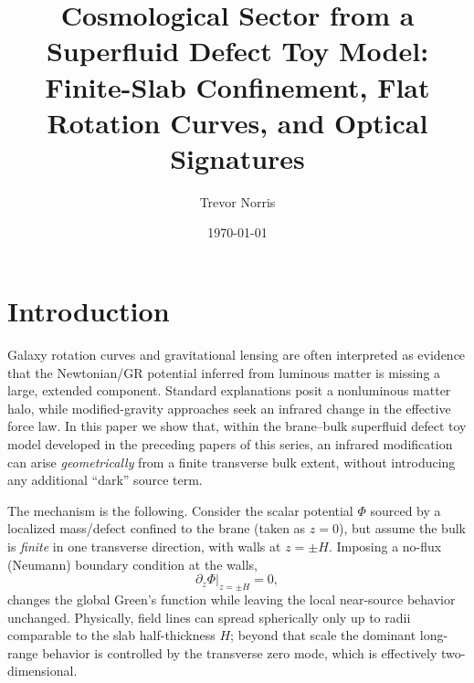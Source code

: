\documentclass[11pt]{article}
\title{Cosmological Sector from a Superfluid Defect Toy Model:\\
Finite-Slab Confinement, Flat Rotation Curves, and Optical Signatures}
\author{Trevor Norris}
\date{\today}
\begin{document}
\maketitle

\begin{abstract}
\end{abstract}

\section{Introduction}
\label{sec:introduction}

Galaxy rotation curves and gravitational lensing are often interpreted as evidence that the
Newtonian/GR potential inferred from luminous matter is missing a large, extended component.
Standard explanations posit a nonluminous matter halo, while modified-gravity approaches seek an
infrared change in the effective force law.
In this paper we show that, within the brane--bulk superfluid defect toy model developed in the
preceding papers of this series, an infrared modification can arise \emph{geometrically} from a
finite transverse bulk extent, without introducing any additional ``dark'' source term.

The mechanism is the following.  Consider the scalar potential $\Phi$ sourced by a localized
mass/defect confined to the brane (taken as $z=0$), but assume the bulk is \emph{finite} in one
transverse direction, with walls at $z=\pm H$.
Imposing a no-flux (Neumann) boundary condition at the walls,
\begin{equation}
  \partial_z \Phi\big|_{z=\pm H}=0,
\end{equation}
changes the global Green's function while leaving the local near-source behavior unchanged.
Physically, field lines can spread spherically only up to radii comparable to the slab half-thickness
$H$; beyond that scale the dominant long-range behavior is controlled by the transverse zero mode,
which is effectively two-dimensional.
\end{document}

